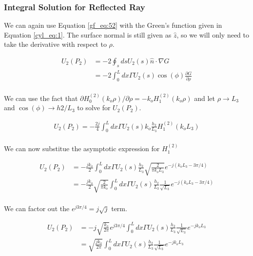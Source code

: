 \subsubsection{Integral Solution for Reflected Ray}
We can again use Equation \ref{gf_eq:52} with the Green's function given in Equation \ref{cyl_eq:1}. The surface normal is still given as $\hat{z}$, so we will only need to take the derivative with respect to $\rho$.
 
\begin{equation}
\begin{aligned}
U_2(P_2) &= -2\oint_s ds U_2(s)\hat{n}\cdot\nabla G\\
&= -2\int_0^L dx \Gamma U_2(s)\cos(\phi)\frac{\partial G}{\partial \rho}\\
\end{aligned}
\label{cyl_eq:6}
\end{equation}
\renewcommand{\baselinestretch}{2} \small\normalsize

We can use the fact that $\partial H_0^{(2)}(k_o\rho)/\partial \rho = -k_oH_1^{(2)}(k_o\rho)$ and let $\rho \rightarrow L_3$ and $\cos(\phi) \rightarrow h2/L_3$ to solve for $U_2(P_2)$.

\begin{equation}
\begin{aligned}
U_2(P_2) = -\frac{2j}{4}\int_0^L dx \Gamma U_2(s)k_o\frac{h_2}{L_3}H_1^{(2)}(k_oL_3)\\
\label{cyl_eq:7}
\end{aligned}
\end{equation}
\renewcommand{\baselinestretch}{2} \small\normalsize

\noindent We can now substitue the asymptotic expression for $H_1^{(2)}$

\begin{equation}
\begin{aligned}
U_2(P_2) &= -\frac{jk_o}{2}\int_0^L dx \Gamma U_2(s)\frac{h_2}{L_3}\sqrt{\frac{2}{\pi k_o L_3}}e^{-j(k_oL_3-3\pi /4)}\\
&= -\frac{jk_o}{2}\sqrt{\frac{2}{\pi k_o}}\int_0^L dx \Gamma U_2(s)\frac{h_2}{L_3}\frac{1}{\sqrt{L_3}}e^{-j(k_oL_3-3\pi /4)} \\
\label{cyl_eq:7b}
\end{aligned}
\end{equation}
\renewcommand{\baselinestretch}{2} \small\normalsize

\noindent We can factor out the  $e^{j3\pi /4} = j\sqrt{j}$ term.

\begin{equation}
\begin{aligned}
U_2(P_2) &= -j\sqrt{\frac{k_o}{2\pi}}e^{j3\pi /4}\int_0^L dx \Gamma U_2(s)\frac{h_2}{L_3}\frac{1}{\sqrt{L_3}}e^{-jk_oL_3} \\
&= \sqrt{\frac{j k_o}{2\pi}}\int_0^L dx \Gamma U_2(s)\frac{h_2}{L_3}\frac{1}{\sqrt{L_3}}e^{-jk_oL_3} \\
\label{cyl_eq:7ba}
\end{aligned}
\end{equation}
\renewcommand{\baselinestretch}{2} \small\normalsize

